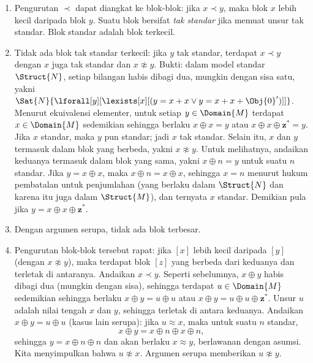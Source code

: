 \documentclass[../../../include/open-logic-section]{subfiles}
\begin{document}
\begin{enumerate}
  $\Sat{N}{\lforall[x][\lforall[y][(x < y \lif (x' < y \lor x' =
      y))]]}$, berlaku $x^* \prec y$ atau $x^* = y$. Yang terakhir mustahil
  karena menyiratkan $x \approx y$, sehingga $x^* \prec y$. Serupa dengan
  itu, jika $x \prec y$ dan $x \not\approx y$, maka $x \prec {^*y}$.
  Karena itu, jika $x \prec y$ dan $x \not\approx y$, maka setiap
  $w \approx x$ $\prec$-kurang dari setiap $v \approx y$. Dengan demikian,
  setiap blok $[x]$ membentuk rantai tak hingga ganda
  \[
  \cdots \prec {^{**}x} \prec {^*}x \prec x \prec x^* \prec x^{**}
  \prec \cdots
  \]
  yang disebut rantai-$Z$ karena memiliki tipe urutan bilangan bulat.
\item Pengurutan $\prec$ dapat diangkat ke blok-blok: jika $x \prec y$,
  maka blok $x$ lebih kecil daripada blok $y$. Suatu blok bersifat
  \emph{tak standar} jika memuat unsur tak standar. Blok standar adalah
  blok terkecil.
\item Tidak ada blok tak standar terkecil: jika $y$ tak standar, terdapat
  $x \prec y$ dengan $x$ juga tak standar dan $x \not\approx y$. Bukti:
  dalam model standar $\Struct{N}$, setiap bilangan habis dibagi dua,
  mungkin dengan sisa satu, yakni
  $\Sat{N}{\lforall[y][\lexists[x][(y = x + x \lor y = x + x +
        \Obj{0}')]]}$. Menurut ekuivalensi elementer, untuk setiap $y \in
  \Domain{M}$ terdapat $x \in \Domain{M}$ sedemikian sehingga berlaku
  $x \oplus x = y$ atau $x \oplus x \oplus \mathbf{z}^*= y$. Jika $x$
  standar, maka $y$ pun standar; jadi $x$ tak standar. Selain itu, $x$ dan
  $y$ termasuk dalam blok yang berbeda, yakni $x \not\approx y$. Untuk
  melihatnya, andaikan keduanya termasuk dalam blok yang sama, yakni
  $x \oplus n = y$ untuk suatu $n$ standar. Jika $y = x \oplus x$, maka
  $x \oplus n = x \oplus x$, sehingga $x = n$ menurut hukum pembatalan
  untuk penjumlahan (yang berlaku dalam $\Struct{N}$ dan karena itu juga
  dalam $\Struct{M}$), dan ternyata $x$ standar. Demikian pula jika
  $y = x \oplus x \oplus \mathbf{z}^*$.
\item Dengan argumen serupa, tidak ada blok terbesar.
\item Pengurutan blok-blok tersebut rapat: jika $[x]$ lebih kecil daripada
  $[y]$ (dengan $x \not\approx y$), maka terdapat blok $[z]$ yang berbeda
  dari keduanya dan terletak di antaranya. Andaikan $x \prec y$. Seperti
  sebelumnya, $x \oplus y$ habis dibagi dua (mungkin dengan sisa), sehingga
  terdapat $u \in \Domain{M}$ sedemikian sehingga berlaku $x \oplus y =
  u \oplus u$ atau $x \oplus y = u \oplus u \oplus \mathbf{z}^*$. Unsur
  $u$ adalah nilai tengah $x$ dan $y$, sehingga terletak di antara keduanya.
  Andaikan $x \oplus y = u \oplus u$ (kasus lain serupa): jika
  $u \approx x$, maka untuk suatu $n$ standar,
  \[
  x \oplus y = x \oplus n \oplus x \oplus n,
  \]
  sehingga $y = x \oplus n \oplus n$ dan akan berlaku $x \approx y$,
  berlawanan dengan asumsi. Kita menyimpulkan bahwa $u \not\approx x$.
  Argumen serupa memberikan $u \not\approx y$.
\end{enumerate}
\end{document}

